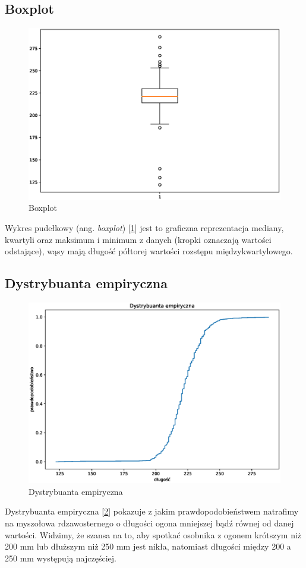 \documentclass{article}
\theoremstyle{break}
\begin{document}
	\subsection{Boxplot}
	\begin{figure}[H]
	\begin{center}
		\includegraphics[scale=0.75]{BOXPLOT.eps}
		\caption{Boxplot}
		\label{fig:box}
	\end{center}
	\end{figure}
Wykres pudełkowy (ang. \textit{boxplot}) [\ref{fig:box}] jest to graficzna reprezentacja mediany, kwartyli oraz maksimum i minimum z danych (kropki oznaczają wartości odstające), wąsy mają długość półtorej wartości rozstępu międzykwartylowego.
	\subsection{Dystrybuanta empiryczna}
	\begin{figure}[H]
		\includegraphics[scale=0.75]{DYSTRYBUANTA.eps}
		\caption{Dystrybuanta empiryczna}
		\label{fig:dystr}
	\end{figure}
Dystrybuanta empiryczna [\ref{fig:dystr}] pokazuje z jakim prawdopodobieństwem natrafimy na myszołowa rdzawosternego o długości ogona mniejszej bądź równej od danej wartości. Widzimy, że szansa na to, aby spotkać osobnika z ogonem krótszym niż 200 mm lub dłuższym niż 250 mm jest nikła, natomiast długości między 200 a 250 mm występują najczęściej.
\end{document}
